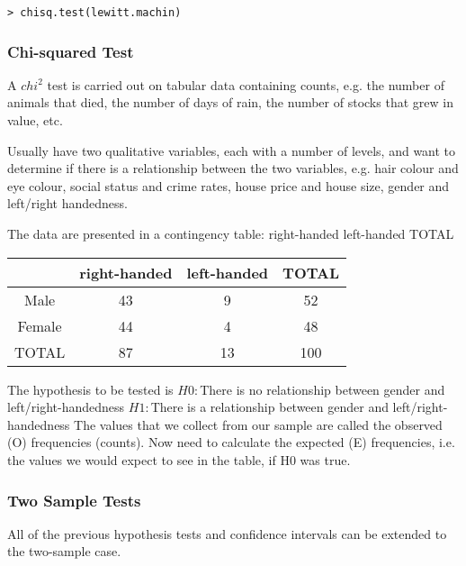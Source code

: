 \documentclass[a4paper,12pt]{article}
\begin{document}
\begin{itemize}
\begin{itemize}
\footnotesize \begin{verbatim}
> chisq.test(lewitt.machin)
\end{verbatim}\normalsize



\subsubsection{Chi-squared Test}

A $chi^2$ test is carried out on tabular data containing counts, e.g. the
number of animals that died, the number of days of rain, the
number of stocks that grew in value, etc.

Usually have two qualitative variables, each with a number of
levels, and want to determine if there is a relationship between the
two variables, e.g. hair colour and eye colour, social status and
crime rates, house price and house size, gender and left/right
handedness.

The data are presented in a contingency table:
right-handed left-handed TOTAL

\begin{tabular}{|c|c|c|c|}
  \hline
  & right-handed &left-handed & TOTAL\\\hline
  Male & 43 & 9 & 52 \\
  Female & 44 & 4 & 48 \\
  TOTAL & 87 & 13 & 100 \\
  \hline
\end{tabular}


The hypothesis to be tested is
$H0 :$There is no relationship between gender and left/right-handedness
$H1 :$There is a relationship between gender and left/right-handedness
 The values that we collect from our sample are called the observed
(O) frequencies (counts). Now need to calculate the expected (E)
frequencies, i.e. the values we would expect to see in the table, if
H0 was true.






\subsubsection{Two Sample Tests}


All of the previous hypothesis tests and confidence intervals can be
extended to the two-sample case.


\end{itemize}
\end{itemize}
\end{document}
